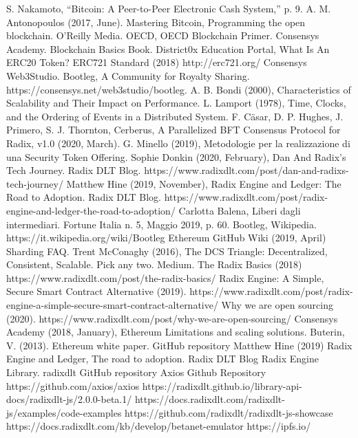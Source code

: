\begin{thebibliography}{90}             %

 S. Nakamoto, “Bitcoin: A Peer-to-Peer Electronic Cash System,” p. 9.
 A. M. Antonopoulos (2017, June). Mastering Bitcoin, Programming the open blockchain. O'Reilly Media.
 OECD, OECD Blockchain Primer.
 Consensys Academy. Blockchain Basics Book.
 District0x Education Portal, What Is An ERC20 Token?
 ERC721 Standard (2018) http://erc721.org/
 Consensys Web3Studio. Bootleg, A Community for Royalty Sharing. https://consensys.net/web3studio/bootleg.
 A. B. Bondi (2000), Characteristics of Scalability and Their Impact on Performance.
 L. Lamport (1978), Time, Clocks, and the Ordering of Events in a Distributed System.
 F. C{\"a}sar, D. P. Hughes, J. Primero, S. J. Thornton, Cerberus, A Parallelized BFT Consensus Protocol for Radix, v1.0 (2020, March).
 G. Minello (2019), Metodologie per la realizzazione di una Security Token Offering.
 Sophie Donkin (2020, February), Dan And Radix's Tech Journey. Radix DLT Blog. https://www.radixdlt.com/post/dan-and-radixs-tech-journey/
 Matthew Hine (2019, November), Radix Engine and Ledger: The Road to Adoption. Radix DLT Blog. https://www.radixdlt.com/post/radix-engine-and-ledger-the-road-to-adoption/
 Carlotta Balena, Liberi dagli intermediari. Fortune Italia n. 5, Maggio 2019, p. 60.
 Bootleg, Wikipedia.  https://it.wikipedia.org/wiki/Bootleg
 Ethereum GitHub Wiki (2019, April) Sharding FAQ.
 Trent McConaghy (2016), The DCS Triangle: Decentralized, Consistent, Scalable. Pick any two. Medium.
 The Radix Basics (2018) https://www.radixdlt.com/post/the-radix-basics/
 Radix Engine: A Simple, Secure Smart Contract Alternative (2019). https://www.radixdlt.com/post/radix-engine-a-simple-secure-smart-contract-alternative/
 Why we are open sourcing (2020). https://www.radixdlt.com/post/why-we-are-open-sourcing/
 Consensys Academy (2018, January), Ethereum Limitations and scaling solutions.
 Buterin, V. (2013). Ethereum white paper. GitHub repository
 Matthew Hine (2019) Radix Engine and Ledger, The road to adoption. Radix DLT Blog
 Radix Engine Library. radixdlt GitHub repository
 Axios Github Repository https://github.com/axios/axios
 https://radixdlt.github.io/library-api-docs/radixdlt-js/2.0.0-beta.1/
 https://docs.radixdlt.com/radixdlt-js/examples/code-examples
 https://github.com/radixdlt/radixdlt-js-showcase
 https://docs.radixdlt.com/kb/develop/betanet-emulator
 https://ipfs.io/


\end{thebibliography}